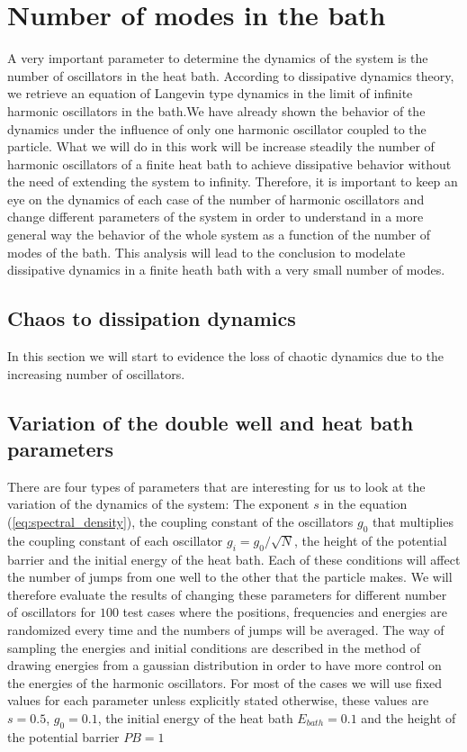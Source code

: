 \section{Number of modes in the bath}
A very important parameter to determine the dynamics of the system is the number of oscillators in the heat bath. According to dissipative dynamics theory, we retrieve an equation of Langevin type dynamics in the limit of infinite harmonic oscillators in the bath.We have already shown the behavior of the dynamics under the influence of only one harmonic oscillator coupled to the particle. What we will do in this work will be increase steadily the number of harmonic oscillators of a finite heat bath to achieve dissipative behavior without the need of extending the system to infinity. Therefore, it is important to keep an eye on the dynamics of each case of the number of harmonic oscillators and change different parameters of the system in order to understand in a more general way the behavior of the whole system as a function of the number of modes of the bath. This analysis will lead to the conclusion to modelate dissipative dynamics in a finite heath bath with a very small number of modes.

\subsection{Chaos to dissipation dynamics}
In this section we will start to evidence the loss of chaotic dynamics due to the increasing number of oscillators. 


\subsection{Variation of the double well and heat bath parameters}
There are four types of parameters that are interesting for us to look at the variation of the dynamics of the system: The exponent $s$ in the  equation (\ref{eq:spectral_density}), the coupling constant of the oscillators $g_0$ that multiplies the coupling constant of each oscillator $g_i=g_0/\sqrt{N}$, the height of the potential barrier and the initial energy of the heat bath. Each of these conditions will affect the number of jumps from one well to the other that the particle makes. We will therefore evaluate the results of changing these parameters for different number of oscillators for $100$ test cases where the positions, frequencies and energies are randomized every time and the numbers of jumps will be averaged. The way of sampling the energies and initial conditions are described in the method of drawing energies from a gaussian distribution in order to have more control on the energies of the harmonic oscillators. For most of the cases we will use fixed values for each parameter unless explicitly stated otherwise, these values are $s=0.5$, $g_0=0.1$, the initial energy of the heat bath $E_{bath}=0.1$ and the height of the potential barrier $PB=1$

